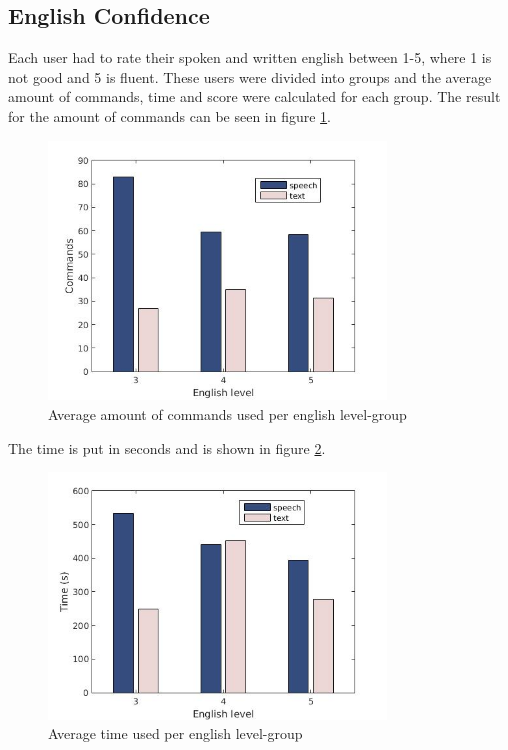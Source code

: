 \subsection{English Confidence} \label{sec:eng_con}
Each user had to rate their spoken and written english between 1-5, where 1 is not good and 5 is fluent. These users were divided into groups and the average amount of commands, time and score were calculated for each group. The result for the amount of commands can be seen in figure \ref{eng_cmd}. 
\begin{figure}[ht]
  \centering
  \includegraphics[width=0.8\textwidth]{images/english_cmd.jpg}
  \caption{Average amount of commands used per english level-group}\label{eng_cmd}
\end{figure}
The time is put in seconds and is shown in figure \ref{eng_time}.
\begin{figure}[ht]
  \centering
  \includegraphics[width=0.8\textwidth]{images/english_time.jpg}
  \caption{Average time used per english level-group}\label{eng_time}
\end{figure}
